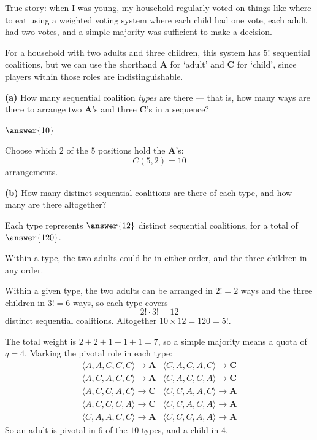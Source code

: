 \documentclass[12pt]{ximera}
\begin{document}
\begin{problem}
True story: when I was young, my household regularly voted on things like where to eat
using a weighted voting system where each child had one vote, each adult had two
votes, and a simple majority was sufficient to make a decision.

For a household with two adults and three children, this system has $5!$ sequential
coalitions, but we can use the shorthand \textbf{A} for `adult' and \textbf{C} for
`child', since players within those roles are indistinguishable.

\begin{prompt}
\textbf{(a)} How many sequential coalition \emph{types} are there --- that is, how many
ways are there to arrange two \textbf{A}'s and three \textbf{C}'s in a sequence?

$\answer{10}$

\begin{feedback}
Choose which $2$ of the $5$ positions hold the \textbf{A}'s:
\[ C(5,2) = 10 \]
arrangements.
\end{feedback}
\end{prompt}

\begin{prompt}
\textbf{(b)} How many distinct sequential coalitions are there of each type, and how
many are there altogether?

Each type represents $\answer{12}$ distinct sequential coalitions, for a total of
$\answer{120}$.

\begin{hint}
Within a type, the two adults could be in either order, and the three children in any
order.
\end{hint}

\begin{feedback}
Within a given type, the two adults can be arranged in $2!=2$ ways and the three
children in $3!=6$ ways, so each type covers
\[ 2!\cdot 3! = 12 \]
distinct sequential coalitions. Altogether $10 \times 12 = 120 = 5!$. \checkmark

The total weight is $2+2+1+1+1 = 7$, so a simple majority means a quota of $q = 4$.
Marking the pivotal role in each type:
\[
\begin{array}{ll}
\langle A,A,C,C,C\rangle \to \textbf{A} &
\langle C,A,C,A,C\rangle \to \textbf{C}\\
\langle A,C,A,C,C\rangle \to \textbf{A} &
\langle C,A,C,C,A\rangle \to \textbf{C}\\
\langle A,C,C,A,C\rangle \to \textbf{C} &
\langle C,C,A,A,C\rangle \to \textbf{A}\\
\langle A,C,C,C,A\rangle \to \textbf{C} &
\langle C,C,A,C,A\rangle \to \textbf{A}\\
\langle C,A,A,C,C\rangle \to \textbf{A} &
\langle C,C,C,A,A\rangle \to \textbf{A}
\end{array}
\]
So an adult is pivotal in $6$ of the $10$ types, and a child in $4$.
\end{feedback}
\end{prompt}


\end{problem}
\end{document}
